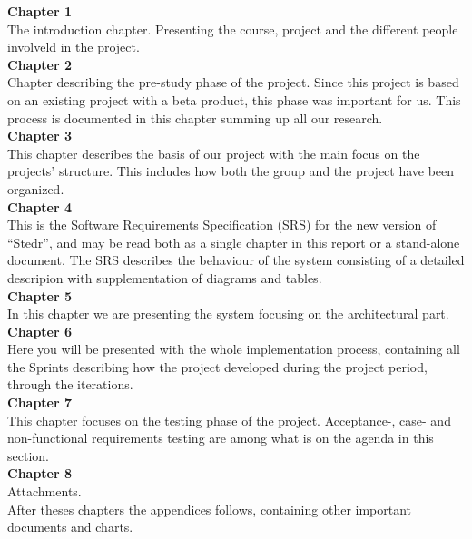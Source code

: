 \textbf{Chapter 1}\\
 The introduction chapter. Presenting the course, project and the different people involveld in the project.\\[20pt]
\textbf{Chapter 2}\\
Chapter describing the pre-study phase of the project. Since this project is based on an existing project with a beta product, this phase was important for us. This process is documented in this chapter summing up all our research. \\[20pt]
\textbf{Chapter 3}\\
This chapter describes the basis of our project with the main focus on the projects' structure. This includes how both the group and the project have been organized.\\[20pt]
\textbf{Chapter 4}\\
This is the Software Requirements Specification (SRS) for the new version of ``Stedr'', and may be read both as a single chapter in this report or a stand-alone document. The SRS describes the behaviour of the system consisting of a detailed descripion with supplementation of diagrams and tables.\\[20pt]
\textbf{Chapter 5}\\
In this chapter we are presenting the system focusing on the architectural part.\\[20pt]
\textbf{Chapter 6}\\
Here you will be presented with the whole implementation process, containing all the Sprints describing how the project developed during the project period, through the iterations.\\[20pt]
\textbf{Chapter 7}\\
This chapter focuses on the testing phase of the project. Acceptance-, case- and non-functional requirements testing are among what is on the agenda in this section.\\[20pt]
 \textbf{Chapter 8}\\
Attachments.\\[20pt]
After theses chapters the appendices follows, containing other important documents and charts.

